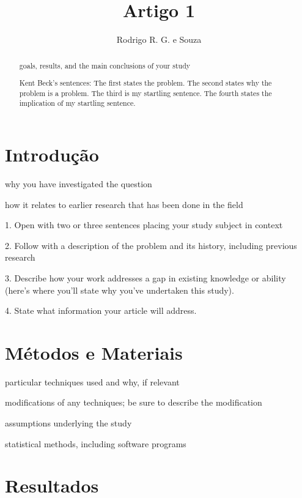 \documentclass{article}
\begin{document}
\title{Artigo 1}
\author{Rodrigo R. G. e Souza}
\maketitle


\begin{abstract}

goals, results, and the main conclusions of your study

Kent Beck's sentences: The first states the problem. The second states why the problem is a problem. The third is my startling sentence. The fourth states the implication of my startling sentence.

\end{abstract}

\section{Introdução} %

why you have investigated the question

how it relates to earlier research that has been done in the field

1. Open with two or three sentences placing your study subject in context

2. Follow with a description of the problem and its history, including previous research

3. Describe how your work addresses a gap in existing knowledge or ability (here's where you'll state why you've undertaken this study). 

4. State what information your article will address. 

\section{Métodos e Materiais} %

particular techniques used and why, if relevant

modifications of any techniques; be sure to describe the modification

assumptions underlying the study 

statistical methods, including software programs 

\section{Resultados} %
\end{document}
